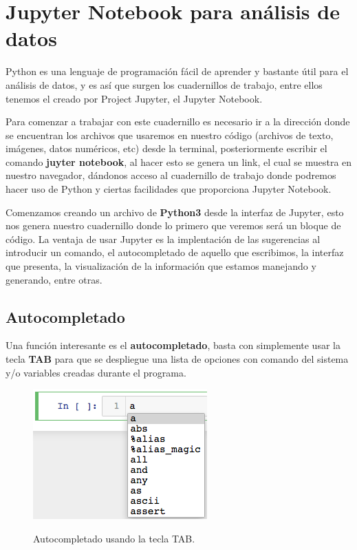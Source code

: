 \documentclass[a4paper]{article}
\begin{document}
\section{Jupyter Notebook para análisis de datos}

Python es una lenguaje de programación fácil de aprender y bastante útil para el análisis de datos, y es así que surgen los cuadernillos de trabajo, entre ellos tenemos el creado por Project Jupyter, el Jupyter Notebook.

Para comenzar a trabajar con este cuadernillo es necesario ir a la dirección donde se encuentran los archivos que usaremos en nuestro código (archivos de texto, imágenes, datos numéricos, etc) desde la terminal, posteriormente escribir el comando \textbf{juyter notebook}, al hacer esto se genera un link, el cual se muestra en nuestro navegador, dándonos acceso al cuadernillo de trabajo donde podremos hacer uso de Python y ciertas facilidades que proporciona Jupyter Notebook.

Comenzamos creando un archivo de \textbf{Python3} desde la interfaz de Jupyter, esto nos genera nuestro cuadernillo donde lo primero que veremos será un bloque de código. La ventaja de usar Jupyter es la implentación de las sugerencias al introducir un comando, el autocompletado de aquello que escribimos, la interfaz que presenta, la visualización de la información que estamos manejando y generando, entre otras.

\subsection{Autocompletado}

Una función interesante es el \textbf{autocompletado}, basta con simplemente usar la tecla \textbf{TAB} para que se despliegue una lista de opciones con comando del sistema y/o variables creadas durante el programa.

\begin{figure}[h!]
	\center
	\includegraphics[scale=.5]{./Images/Tabcomplete}
	\label{Tab Complete}
	\caption{Autocompletado usando la tecla TAB.}
\end{figure}
\end{document}
